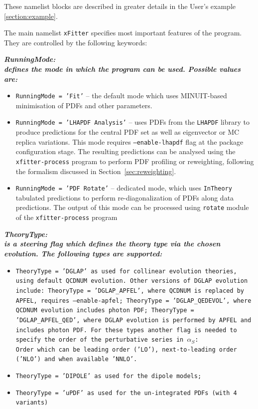 \begin{description}
These namelist blocks are described in greater details in the User's example \ref{section:example}. 

The main namelist {\tt xFitter} specifies most important features of the program. They are controlled
by the following keywords:
\begin{description}
\item \it\bf RunningMode: \rm\\
defines the mode in which the program can be used. Possible values are:
\begin{itemize}
\item {\tt RunningMode = 'Fit'} -- the default mode which uses MINUIT-based minimisation of PDFs and other parameters.
\item {\tt RunningMode = 'LHAPDF Analysis'} -- uses PDFs from the {\tt LHAPDF} library to produce predictions for the
central PDF set as well as eigenvector or MC replica variations. This mode requires {\tt --enable-lhapdf} flag 
at the package  configuration stage. The resulting predictions can be analysed using the {\tt xfitter-process} program
to perform PDF profiling or reweighting, following the formalism discussed in Section~\ref{sec:reweighting}.
\item {\tt RunningMode = 'PDF Rotate'} -- dedicated mode, which uses  {\tt InTheory} tabulated predictions to perform
re-diagonalization of PDFs along data predictions. The output of this mode can be processed using
{\tt rotate} module of  the {\tt  xfitter-process} program
\end{itemize}
\item \it\bf TheoryType: \rm\\
 is a steering flag which defines the theory type via the chosen evolution.
The following types are supported:
\begin{itemize}
\item \tt{TheoryType = 'DGLAP' }\rm as used for collinear evolution theories, using default QCDNUM evolution.
Other versions of DGLAP evolution include:  {\tt TheoryType = 'DGLAP\_APFEL'}, 
where QCDNUM is replaced by APFEL, requires
{\tt --enable-apfel};   {\tt TheoryType = 'DGLAP\_QEDEVOL'}, where QCDNUM evolution includes photon PDF;  
{\tt TheoryType = 'DGLAP\_APFEL\_QED'}, where DGLAP evolution is performed by APFEL and includes photon PDF.  
For these types another 
 flag is needed to specify the order of the perturbative series in $\alpha_S$:\\
{\tt Order}  which can be leading order ('LO'), next-to-leading order ('NLO') and when available 'NNLO'.
\item \tt{TheoryType = 'DIPOLE' }\rm as used for the dipole models;
\item \tt{TheoryType = 'uPDF' }\rm as used for the un-integrated PDFs (with 4 variants)
\end{itemize}


\end{description}
\end{description}
